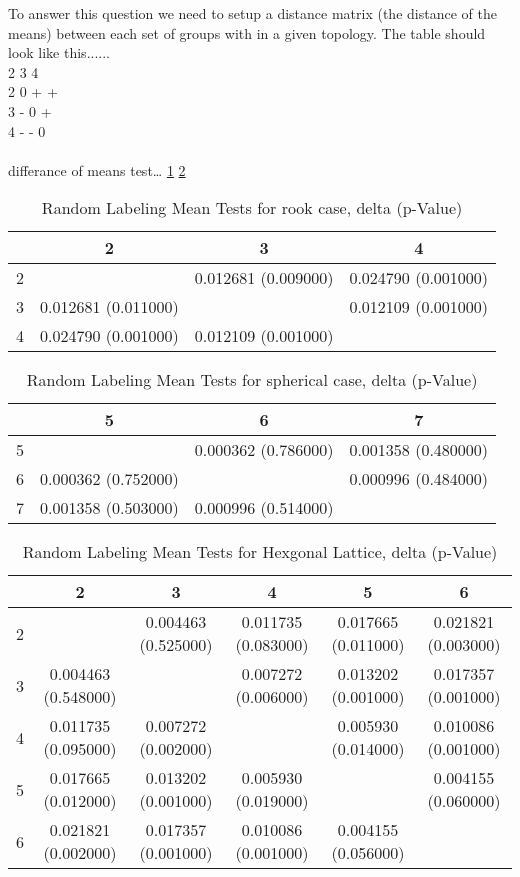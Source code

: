 To answer this question we need to setup a distance matrix (the distance of the
means) between each set of groups with in a given topology.  The table should
look like this...... 
\\
  2 3 4\\
2 0 + +\\
3 - 0 +\\
4 - - 0\\
\\
differance of means test\ldots
\ref{randomLabelTableRook}
\ref{randomLabelTableGraph}

\begin{table}
\centering
\caption{Random Labeling Mean Tests for rook case,  delta (p-Value)}
\label{randomLabelTableRook}
\begin{tabular}{|c||c|c|c|}
\hline
&2&3&4\\
\hline
\hline
2& & 0.012681 (0.009000)& 0.024790 (0.001000)\\
\hline
3& 0.012681 (0.011000)& & 0.012109 (0.001000)\\
\hline
4& 0.024790 (0.001000)& 0.012109 (0.001000)& \\
\hline
\end{tabular} \end{table}


\begin{table}
\centering
\caption{Random Labeling Mean Tests for spherical case,  delta (p-Value)}
\label{randomLabelTableGraph}
\begin{tabular}{|c||c|c|c|}
\hline
&5&6&7\\
\hline
\hline
5& & 0.000362 (0.786000)& 0.001358 (0.480000)\\
\hline
6& 0.000362 (0.752000)& & 0.000996 (0.484000)\\
\hline
7& 0.001358 (0.503000)& 0.000996 (0.514000)& \\
\hline
\end{tabular} \end{table}

\begin{table}
\centering
\caption{Random Labeling Mean Tests for Hexgonal Lattice,  delta (p-Value)}
\label{randomLabelTable}
\begin{tabular}{|c||c|c|c|c|c|}
\hline
&2&3&4&5&6\\
\hline
\hline
2& & 0.004463 (0.525000)& 0.011735 (0.083000)& 0.017665 (0.011000)& 0.021821
(0.003000)\\
\hline
3& 0.004463 (0.548000)& & 0.007272 (0.006000)& 0.013202 (0.001000)& 0.017357
(0.001000)\\
\hline
4& 0.011735 (0.095000)& 0.007272 (0.002000)& & 0.005930 (0.014000)& 0.010086
(0.001000)\\
\hline
5& 0.017665 (0.012000)& 0.013202 (0.001000)& 0.005930 (0.019000)& & 0.004155
(0.060000)\\
\hline
6& 0.021821 (0.002000)& 0.017357 (0.001000)& 0.010086 (0.001000)& 0.004155
(0.056000)& \\
\hline
\end{tabular} \end{table}





